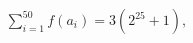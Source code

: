 \documentclass[preview]{standalone}
\begin{document}
\begin{align*}
\sum_{i=1}^{50} f(a_i) = 3(2^{25} + 1),
\end{align*}
\end{document}
